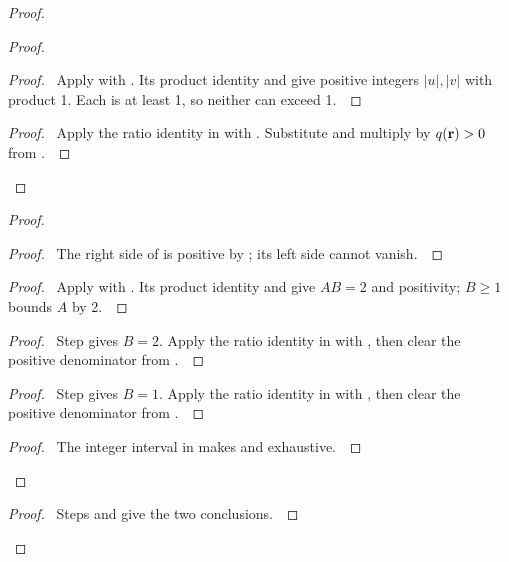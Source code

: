\documentclass[11pt]{amsart}
\let\qed\relax
\begin{document}
\begin{proof}
\begin{proof}
 \begin{proof}\pf\ Apply  with
 . Its product identity and 
 give positive integers $|u|,|v|$ with product 1.
 Each is at least 1, so neither can exceed 1.~\qed\end{proof}
 \qedstep
 \begin{proof}\pf\ Apply the ratio identity in
  with .
 Substitute  and multiply by
 $q({\mathbf r})>0$ from .~\qed\end{proof}
\end{proof}
\begin{proof}
 \begin{proof}\pf\ The right side of  is positive by
 ; its left side cannot vanish.~\qed\end{proof}
 \begin{proof}\pf\ Apply  with
 . Its product identity and 
 give $AB=2$ and positivity; $B\geq1$ bounds $A$ by 2.~\qed\end{proof}
 \begin{proof}\pf\ Step  gives $B=2$.
 Apply the ratio identity in  with
 , then clear the positive denominator
 from .~\qed\end{proof}
 \begin{proof}\pf\ Step  gives $B=1$.
 Apply the ratio identity in  with
 , then clear the positive denominator
 from .~\qed\end{proof}
 \qedstep
 \begin{proof}\pf\ The integer interval in 
 makes  and 
 exhaustive.~\qed\end{proof}
\end{proof}
\qedstep
\begin{proof}\pf\ Steps  and
 give the two conclusions.~\qed\end{proof}
\end{proof}
\end{document}
